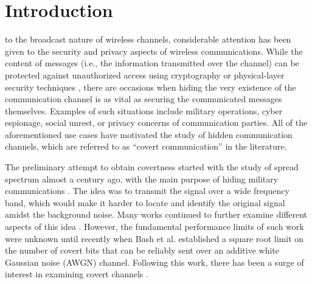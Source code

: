 \section{Introduction}
% 
% 
% 
% 
 to the broadcast nature of wireless channels, considerable attention has been given to the security and privacy aspects of wireless communications. While the content of messages (i.e., the information transmitted over the channel) can be protected against unauthorized access using cryptography or physical-layer security techniques \cite{zhou2013physical}, there are occasions when hiding the very existence of the communication channel is as vital as securing the communicated messages themselves. Examples of such situations include military operations, cyber espionage, social unrest, or privacy concerns of communication parties. All of the aforementioned use cases have motivated the study of hidden communication channels, which are referred to as ``covert communication'' \cite{lampson1973note, bloch2016covert} in the literature.

The preliminary attempt to obtain covertness started with the study of spread spectrum almost a century ago, with the main purpose of hiding military communications \cite{scholtz1982origins}. The idea was to transmit the signal over a wide frequency band, which would make it harder to locate and identify the original signal amidst the background noise. Many works continued to further examine different aspects of this idea \cite{reynders2016chirp, yan2019low}. However, the fundamental performance limits of such work were unknown until recently when Bash et al. \cite{bash2012square, bash2013limits} established a square root limit on the number of covert bits that can be reliably sent over an additive white Gaussian noise (AWGN) channel. Following this work, there has been a surge of interest in examining covert channels \cite{sobers2017covert,soltani2018covert,sheikholeslami2018multi,cao2018wireless}.

